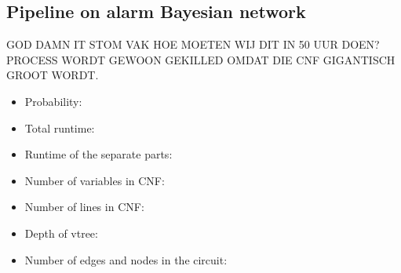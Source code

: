 \subsection{Pipeline on alarm Bayesian network}
GOD DAMN IT STOM VAK HOE MOETEN WIJ DIT IN 50 UUR DOEN? PROCESS WORDT GEWOON GEKILLED OMDAT DIE CNF GIGANTISCH GROOT WORDT.
\item \begin{itemize}
    \item Probability:
    \item Total runtime:
    \item Runtime of the separate parts:
    \item Number of variables in CNF:
    \item Number of lines in CNF:
    \item Depth of vtree:
    \item Number of edges and nodes in the circuit:
\end{itemize}